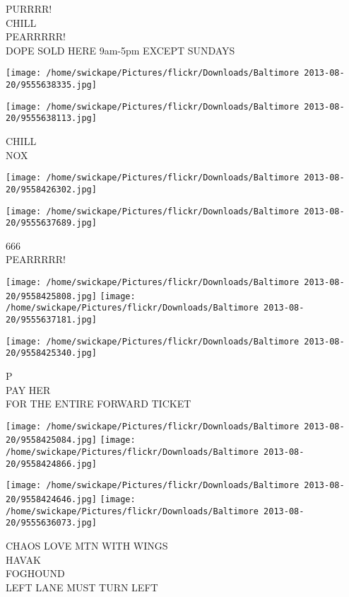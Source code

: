 \documentclass[10pt,letterpaper]{article}
\begin{document}
PURRRR!\\
CHILL\\
PEARRRRR!\\
DOPE SOLD HERE 9am{-}5pm EXCEPT SUNDAYS\\
\pagebreak

\texttt{[image: /home/swickape/Pictures/flickr/Downloads/Baltimore 2013-08-20/9555638335.jpg]}

\vspace{0.25in}
\texttt{[image: /home/swickape/Pictures/flickr/Downloads/Baltimore 2013-08-20/9555638113.jpg]}

CHILL\\
NOX\\
\pagebreak

\texttt{[image: /home/swickape/Pictures/flickr/Downloads/Baltimore 2013-08-20/9558426302.jpg]}

\vspace{0.25in}
\texttt{[image: /home/swickape/Pictures/flickr/Downloads/Baltimore 2013-08-20/9555637689.jpg]}

666\\
PEARRRRR!\\
\pagebreak

\texttt{[image: /home/swickape/Pictures/flickr/Downloads/Baltimore 2013-08-20/9558425808.jpg]}
\texttt{[image: /home/swickape/Pictures/flickr/Downloads/Baltimore 2013-08-20/9555637181.jpg]}

\vspace{0.25in}
\texttt{[image: /home/swickape/Pictures/flickr/Downloads/Baltimore 2013-08-20/9558425340.jpg]}

P\\
PAY HER\\
FOR THE ENTIRE FORWARD TICKET\\
\pagebreak

\texttt{[image: /home/swickape/Pictures/flickr/Downloads/Baltimore 2013-08-20/9558425084.jpg]}
\texttt{[image: /home/swickape/Pictures/flickr/Downloads/Baltimore 2013-08-20/9558424866.jpg]}

\texttt{[image: /home/swickape/Pictures/flickr/Downloads/Baltimore 2013-08-20/9558424646.jpg]}
\texttt{[image: /home/swickape/Pictures/flickr/Downloads/Baltimore 2013-08-20/9555636073.jpg]}

CHAOS LOVE MTN WITH WINGS\\
HAVAK\\
FOGHOUND\\
LEFT LANE MUST TURN LEFT\\
\pagebreak
\end{document}
